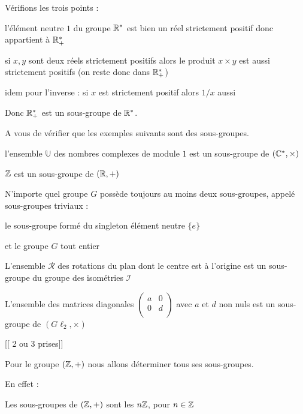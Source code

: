 Vérifions les trois points :

\change

l'élément neutre $1$ du groupe $\mathbb{R}^*$ est bien un réel strictement positif donc appartient à $\mathbb{R}_+^*$

\change

si $x,y$ sont deux réels strictement positifs alors le produit $x \times y$ est aussi strictement positifs
(on reste donc dans  $\mathbb{R}_+^*$)

\change

idem pour l'inverse : si $x$ est strictement positif alors $1/x$ aussi


Donc $\mathbb{R}_+^*$ est un sous-groupe de $\mathbb{R}^*$.

\change

A vous de vérifier que les exemples suivants sont des sous-groupes.

l'ensemble $\mathbb{U}$ des nombres complexes de module $1$ est un sous-groupe de $(\mathbb{C}^*,\times)$

\change

$\mathbb{Z}$ est un sous-groupe de $(\mathbb{R},+)$

\change

N'importe quel groupe $G$ possède toujours au moins deux sous-groupes, appelé sous-groupes triviaux :

le sous-groupe formé du singleton élément neutre $\{e\}$ 

et le groupe $G$ tout entier

\change

 L'ensemble $\mathcal{R}$ des rotations du plan dont le centre est à l'origine 
est un sous-groupe du groupe des isométries $\mathcal{I}$

\change

 L'ensemble des matrices diagonales $\left(\begin{smallmatrix} a & 0 \\ 0 & d \\ \end{smallmatrix}\right)$
avec $a$ et $d$ non nuls est un sous-groupe de $(G\ell_2,\times)$



\diapo

[[ 2 ou 3 prises]]

Pour le groupe $(\mathbb{Z},+)$ nous allons déterminer tous ses sous-groupes.

En effet :

Les sous-groupes de $(\mathbb{Z},+)$ sont les $n\mathbb{Z}$, pour $n\in \mathbb{Z}$

